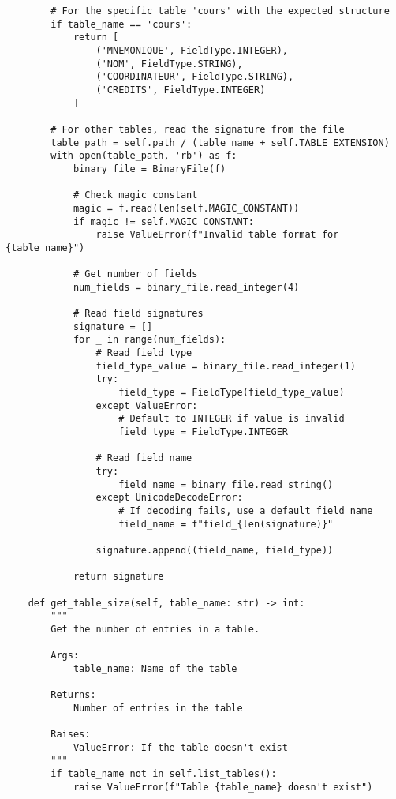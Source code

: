 \documentclass[utf8]{article}
\begin{document}
\begin{verbatim}
        # For the specific table 'cours' with the expected structure
        if table_name == 'cours':
            return [
                ('MNEMONIQUE', FieldType.INTEGER),
                ('NOM', FieldType.STRING),
                ('COORDINATEUR', FieldType.STRING),
                ('CREDITS', FieldType.INTEGER)
            ]
        
        # For other tables, read the signature from the file
        table_path = self.path / (table_name + self.TABLE_EXTENSION)
        with open(table_path, 'rb') as f:
            binary_file = BinaryFile(f)
            
            # Check magic constant
            magic = f.read(len(self.MAGIC_CONSTANT))
            if magic != self.MAGIC_CONSTANT:
                raise ValueError(f"Invalid table format for {table_name}")
            
            # Get number of fields
            num_fields = binary_file.read_integer(4)
            
            # Read field signatures
            signature = []
            for _ in range(num_fields):
                # Read field type
                field_type_value = binary_file.read_integer(1)
                try:
                    field_type = FieldType(field_type_value)
                except ValueError:
                    # Default to INTEGER if value is invalid
                    field_type = FieldType.INTEGER
                
                # Read field name
                try:
                    field_name = binary_file.read_string()
                except UnicodeDecodeError:
                    # If decoding fails, use a default field name
                    field_name = f"field_{len(signature)}"
                
                signature.append((field_name, field_type))
            
            return signature
    
    def get_table_size(self, table_name: str) -> int:
        """
        Get the number of entries in a table.
        
        Args:
            table_name: Name of the table
        
        Returns:
            Number of entries in the table
        
        Raises:
            ValueError: If the table doesn't exist
        """
        if table_name not in self.list_tables():
            raise ValueError(f"Table {table_name} doesn't exist")
        

\end{verbatim}
\end{document}
